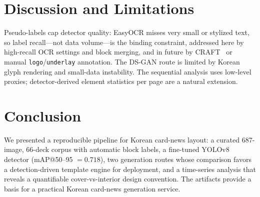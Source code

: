 \documentclass[10pt,twocolumn,letterpaper]{article}
\begin{document}
\section{Discussion and Limitations}
Pseudo-labels cap detector quality: EasyOCR misses very small or stylized text,
so label recall---not data volume---is the binding constraint, addressed here by
high-recall OCR settings and block merging, and in future by CRAFT~\cite{craft2019}
or manual \texttt{logo}/\texttt{underlay} annotation. The DS-GAN route is limited
by Korean glyph rendering and small-data instability. The sequential analysis uses
low-level proxies; detector-derived element statistics per page are a natural
extension.

\section{Conclusion}
We presented a reproducible pipeline for Korean card-news layout: a curated
687-image, 66-deck corpus with automatic block labels, a fine-tuned YOLOv8
detector (mAP@50--95 $=0.718$), two generation routes whose comparison favors a
detection-driven template engine for deployment, and a time-series analysis that
reveals a quantifiable cover-vs-interior design convention. The artifacts provide
a basis for a practical Korean card-news generation service.

{\small


}
\end{document}
